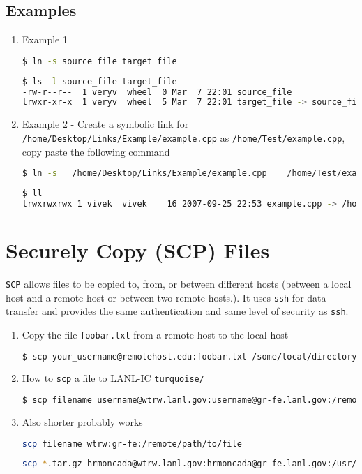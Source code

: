 \subsection{Examples}
\begin{enumerate}
 \item Example 1
\begin{lstlisting}[language=bash,numbers=none] 
$ ln -s source_file target_file
\end{lstlisting}
\begin{lstlisting}[language=bash,numbers=none] 
$ ls -l source_file target_file
-rw-r--r--  1 veryv  wheel  0 Mar  7 22:01 source_file
lrwxr-xr-x  1 veryv  wheel  5 Mar  7 22:01 target_file -> source_file
\end{lstlisting} 
\item Example 2 - Create a symbolic link for \verb+/home/Desktop/Links/Example/example.cpp+ as \verb+/home/Test/example.cpp+,
copy paste the following command
\begin{lstlisting}[language=bash,numbers=none] 
$ ln -s   /home/Desktop/Links/Example/example.cpp    /home/Test/example.cpp
\end{lstlisting}
\begin{lstlisting}[language=bash,numbers=none] 
$ ll
lrwxrwxrwx 1 vivek  vivek    16 2007-09-25 22:53 example.cpp -> /home/Desktop/Links/Example/example.cpp
\end{lstlisting}
\end{enumerate}

\section{Securely Copy (SCP) Files}
\verb+SCP+ allows files to be copied to, from, or between different hosts (between a local host and a remote host or between two remote hosts.).
It uses \verb+ssh+ for data transfer and provides the same authentication and same level of security as \verb+ssh+.
\begin{enumerate}
 \item Copy the file \verb+foobar.txt+ from a remote host to the local host
\begin{lstlisting}[language=bash,numbers=none] 
$ scp your_username@remotehost.edu:foobar.txt /some/local/directory 
\end{lstlisting}
\item How to \verb+scp+ a file to LANL-IC \verb+turquoise/+
\begin{lstlisting}[language=bash,numbers=none] 
$ scp filename username@wtrw.lanl.gov:username@gr-fe.lanl.gov:/remote/path/to/file
\end{lstlisting}
\item Also shorter probably works
\begin{lstlisting}[language=bash,numbers=none] 
scp filename wtrw:gr-fe:/remote/path/to/file
\end{lstlisting}
\begin{lstlisting}[language=bash,numbers=none] 
scp *.tar.gz hrmoncada@wtrw.lanl.gov:hrmoncada@gr-fe.lanl.gov:/usr/projects/climate/hrmoncada/repos/Performance
\end{lstlisting}
\end{enumerate}

